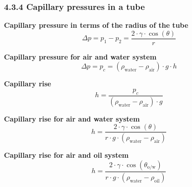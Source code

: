 \subsubsection{4.3.4 Capillary pressures in a tube}
\textbf{Capillary pressure in terms of the radius of the tube}
\begin{equation*}
    \Delta p = p_1 - p_2 = \frac{2\cdot\gamma\cdot\cos(\theta)}{r}\tag{4.28}
\end{equation*}

\textbf{Capillary pressure for air and water system}
\begin{equation*}
    \Delta p = p_c = (\rho_\mathrm{water} - \rho_\mathrm{air})\cdot g\cdot h\tag{4.29}
\end{equation*}

\textbf{Capillary rise}
\begin{equation*}
    h = \frac{p_c}{(\rho_\mathrm{water} - \rho_\mathrm{air})\cdot g}\tag{4.30}
\end{equation*}

\textbf{Capillary rise for air and water system}
\begin{equation*}
    h = \frac{2\cdot\gamma\cdot\cos(\theta)}{r\cdot g\cdot(\rho_\mathrm{water}-\rho_\mathrm{air})}\tag{4.31}
\end{equation*}

\textbf{Capillary rise for air and oil system}
\begin{equation*}
    h = \frac{2\cdot\gamma\cdot\cos(\theta_{\mathrm{o/w}})}{r\cdot g\cdot(\rho_\mathrm{water}-\rho_\mathrm{oil})}\tag{4.32}
\end{equation*}

